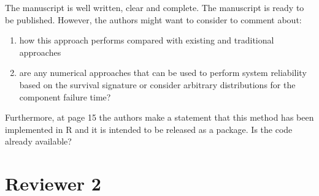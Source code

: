 \documentclass[Journal,SectionNumbers,SingleSpace,InsideFigs]{ascelike}
\begin{document}
The manuscript is well written, clear and complete. The manuscript is ready to be published.
However, the authors might want to consider to comment about:
\begin{enumerate}
\item how this approach performs compared with existing and traditional approaches

\smallskip


\item are any numerical approaches that can be used to perform system reliability based on the survival signature
or consider arbitrary distributions for the component failure time?
\smallskip

\end{enumerate}

Furthermore, at page 15 the authors make a statement that this method has been implemented in R
and it is intended to be released as a package. Is the code already available? 

\section*{Reviewer 2}
\end{document}
